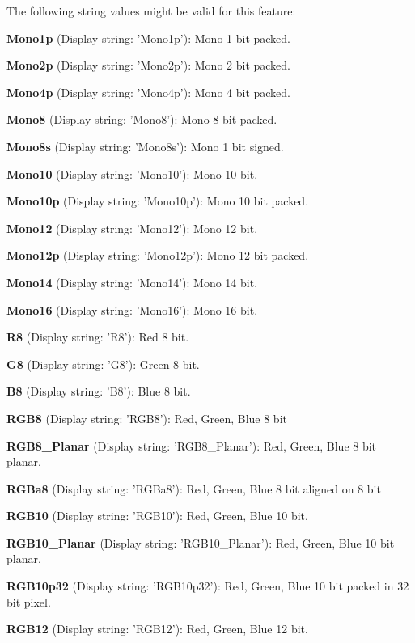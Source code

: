 The following string values might be valid for this feature\+:
\begin{DoxyItemize}
\item {\bfseries Mono1p} (Display string\+: 'Mono1p')\+: Mono 1 bit packed.
\item {\bfseries Mono2p} (Display string\+: 'Mono2p')\+: Mono 2 bit packed.
\item {\bfseries Mono4p} (Display string\+: 'Mono4p')\+: Mono 4 bit packed.
\item {\bfseries Mono8} (Display string\+: 'Mono8')\+: Mono 8 bit packed.
\item {\bfseries Mono8s} (Display string\+: 'Mono8s')\+: Mono 1 bit signed.
\item {\bfseries Mono10} (Display string\+: 'Mono10')\+: Mono 10 bit.
\item {\bfseries Mono10p} (Display string\+: 'Mono10p')\+: Mono 10 bit packed.
\item {\bfseries Mono12} (Display string\+: 'Mono12')\+: Mono 12 bit.
\item {\bfseries Mono12p} (Display string\+: 'Mono12p')\+: Mono 12 bit packed.
\item {\bfseries Mono14} (Display string\+: 'Mono14')\+: Mono 14 bit.
\item {\bfseries Mono16} (Display string\+: 'Mono16')\+: Mono 16 bit.
\item {\bfseries R8} (Display string\+: 'R8')\+: Red 8 bit.
\item {\bfseries G8} (Display string\+: 'G8')\+: Green 8 bit.
\item {\bfseries B8} (Display string\+: 'B8')\+: Blue 8 bit.
\item {\bfseries R\+G\+B8} (Display string\+: 'R\+G\+B8')\+: Red, Green, Blue 8 bit
\item {\bfseries R\+G\+B8\+\_\+\+Planar} (Display string\+: 'R\+G\+B8\+\_\+\+Planar')\+: Red, Green, Blue 8 bit planar.
\item {\bfseries R\+G\+Ba8} (Display string\+: 'R\+G\+Ba8')\+: Red, Green, Blue 8 bit aligned on 8 bit
\item {\bfseries R\+G\+B10} (Display string\+: 'R\+G\+B10')\+: Red, Green, Blue 10 bit.
\item {\bfseries R\+G\+B10\+\_\+\+Planar} (Display string\+: 'R\+G\+B10\+\_\+\+Planar')\+: Red, Green, Blue 10 bit planar.
\item {\bfseries R\+G\+B10p32} (Display string\+: 'R\+G\+B10p32')\+: Red, Green, Blue 10 bit packed in 32 bit pixel.
\item {\bfseries R\+G\+B12} (Display string\+: 'R\+G\+B12')\+: Red, Green, Blue 12 bit.

\end{DoxyItemize}
